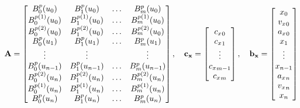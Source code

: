 \begin{equation*}
{\bf A}=   \begin{bmatrix} %
      B_0^p(u_0)        & B_1^p(u_0)         & \ldots & B_m^p(u_0) \\
      B_0^{p(1)}(u_0) & B_1^{p(1)}(u_0) & \ldots & B_m^{p(1)}(u_0) \\
      B_0^{p(2)}(u_0) & B_1^{p(2)}(u_0) & \ldots & B_m^{p(2)}(u_0) \\
      B_0^p(u_1)         & B_1^p(u_1)         & \ldots & B_m^p(u_1) \\
      \vdots			&\vdots		     &            &\vdots \\
      B_0^p(u_{n-1})        & B_1^p(u_{n-1})         & \ldots & B_m^p(u_{n-1}) \\
      B_0^{p(2)}(u_n) & B_1^{p(2)}(u_n) & \ldots & B_m^{p(2)}(u_n) \\
      B_0^{p(1)}(u_n) & B_1^{p(1)}(u_n) & \ldots & B_m^{p(1)}(u_n) \\
      B_0^p(u_n)         & B_1^p(u_n)         & \ldots & B_m^p(u_n) \\
      
   \end{bmatrix},
   \quad 
   {\bf c_x} = \begin{bmatrix}
   {c_x}_0\\
   {c_x}_1\\
   \vdots \\
   {c_x}_{m-1}\\
   {c_x}_{m} 
    \end{bmatrix},
    \quad
   {\bf b_x} =  \begin{bmatrix}
   x_0\\
   {v_x}_0\\
   {a_x}_0\\
   x_1\\
   \vdots \\
   x_{n-1} \\
   {a_x}_n\\
   {v_x}_n\\
   x_n
    \end{bmatrix}
\end{equation*}






